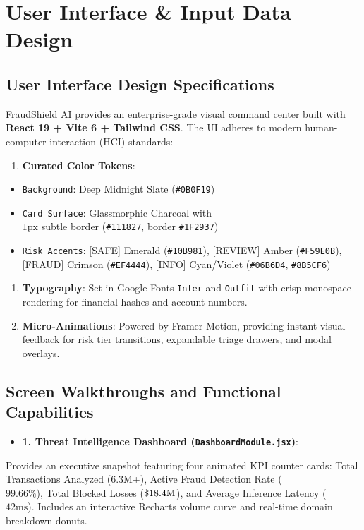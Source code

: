 \documentclass[12pt,a4paper,oneside]{report}
\begin{document}
\section{User Interface \& Input Data Design}

\subsection{User Interface Design Specifications}

FraudShield AI provides an enterprise-grade visual command center built with \textbf{React 19 + Vite 6 + Tailwind CSS}. The UI adheres to modern human-computer interaction (HCI) standards:

\begin{enumerate}[leftmargin=0.35in]
\item \textbf{Curated Color Tokens}:
\end{enumerate}
\begin{itemize}[leftmargin=0.35in]
\item \texttt{Background}: Deep Midnight Slate (\texttt{\#0B0F19})
\item \texttt{Card Surface}: Glassmorphic Charcoal with \\$1\text{px}$ subtle border (\texttt{\#111827}, border \texttt{\#1F2937})
\item \texttt{Risk Accents}: [SAFE] Emerald (\texttt{\#10B981}), [REVIEW] Amber (\texttt{\#F59E0B}), [FRAUD] Crimson (\texttt{\#EF4444}), [INFO] Cyan/Violet (\texttt{\#06B6D4}, \texttt{\#8B5CF6})
\end{itemize}
\begin{enumerate}[leftmargin=0.35in]
\item \textbf{Typography}: Set in Google Fonts \texttt{Inter} and \texttt{Outfit} with crisp monospace rendering for financial hashes and account numbers.
\item \textbf{Micro-Animations}: Powered by Framer Motion, providing instant visual feedback for risk tier transitions, expandable triage drawers, and modal overlays.
\end{enumerate}

\subsection{Screen Walkthroughs and Functional Capabilities}

\begin{itemize}[leftmargin=0.35in]
\item \textbf{1. Threat Intelligence Dashboard (\texttt{DashboardModule.jsx})}:
\end{itemize}
Provides an executive snapshot featuring four animated KPI counter cards: Total Transactions Analyzed (6.3M+), Active Fraud Detection Rate (\\$99.66\%$), Total Blocked Losses ($\\\$18.4\text{M}$), and Average Inference Latency (\\$42\text{ms}$). Includes an interactive Recharts volume curve and real-time domain breakdown donuts.
\end{document}

